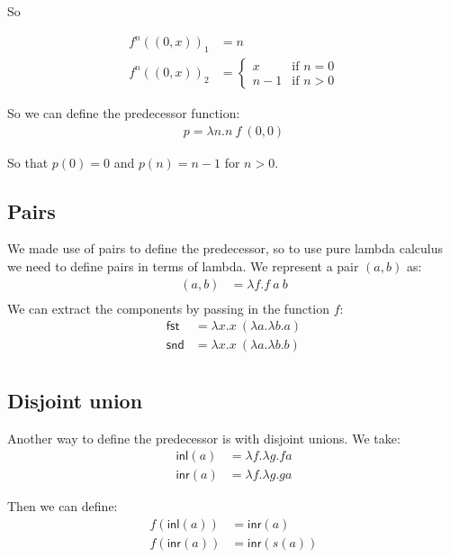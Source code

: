 \documentclass[a4paper, 11pt]{article}
\theoremstyle{definition}
\begin{document}
So

\begin{align*}
  f^n((0,x))_1 &= n\\
  f^n((0,x))_2 &= \begin{cases}
    x & \text{if } n=0 \\
    n-1 & \text{if } n > 0
  \end{cases}
\end{align*}

So we can define the predecessor function:
\begin{align*}
  p = \lambda n. n\ f\ (0,0)
\end{align*}

So that $p(0) = 0$ and $p(n) = n-1$ for $n>0$.

\subsection*{Pairs}

We made use of pairs to define the predecessor, so to use pure lambda calculus we need to define pairs in terms of lambda. We represent a pair $(a,b)$ as:
\begin{align*}
  (a,b) &= \lambda f. f\ a\ b \\
\end{align*}
We can extract the components by passing in the function $f$:
\begin{align*}
  \mathsf{fst} &= \lambda x. x\ (\lambda a. \lambda b. a)\\
  \mathsf{snd} &= \lambda x. x\ (\lambda a. \lambda b. b)\\
\end{align*}

\subsection*{Disjoint union}

Another way to define the predecessor is with disjoint unions. We take:
\begin{align*}
  \mathsf{inl}(a) &= \lambda f. \lambda g. f a \\
  \mathsf{inr}(a) &= \lambda f. \lambda g. g a
\end{align*}

Then we can define:
\begin{align*}
  f(\mathsf{inl}(a)) &= \mathsf{inr}(a)\\
  f(\mathsf{inr}(a)) &= \mathsf{inr}(s(a))
\end{align*}
\end{document}
